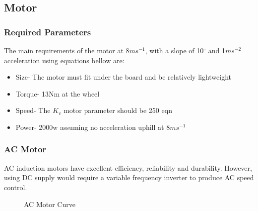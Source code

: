 \documentclass[journal,10pt]{IEEEtran}
\begin{document}
    \subsection{Motor}
        \subsubsection{Required Parameters}
        The main requirements of the motor at 8$ms^{-1}$, with a slope of 10$^{\circ}$ and 1$ms^{-2}$ acceleration using equations bellow are:
        \begin{itemize}
        	\item Size- The motor must fit under the board and be relatively lightweight
        	\item Torque- 13Nm at the wheel 
        	\item Speed- The $K_{v}$ motor parameter should be 250 eqn
        	\item Power- 2000w assuming no acceleration uphill at 8$ms^{-1}$
        \end{itemize}
        \begin{figure}[H]
            \centering
            \label{fig:equations}
        \end{figure}
        
        \subsubsection{AC Motor}
            AC induction motors have excellent efficiency, reliability and durability. However, using DC supply would require a variable frequency inverter to produce AC speed control. 
        \begin{figure}[H]
            \centering
            \label{fig:AC_Curve}
            \caption{AC Motor Curve \cite{AC_Motor_pic}}
        \end{figure}
\end{document}
